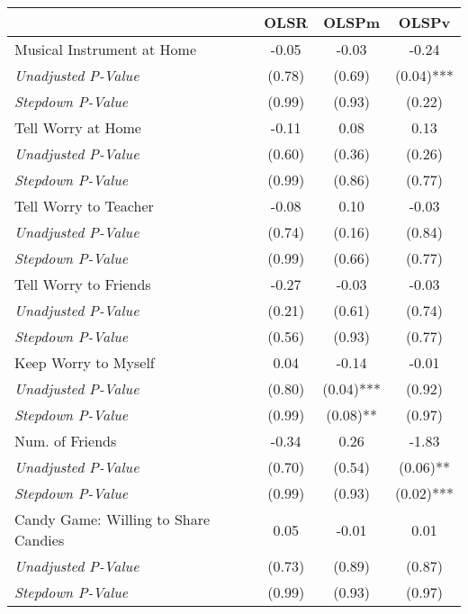 \begin{tabular}{l c c c}
\toprule
 & OLSR & OLSPm & OLSPv \\
\midrule
Musical Instrument at Home & -0.05 & -0.03 & -0.24 \\
\quad \textit{Unadjusted P-Value} & (0.78) & (0.69) & (0.04)*** \\
\quad \textit{Stepdown P-Value} & (0.99) & (0.93) & (0.22) \\
Tell Worry at Home & -0.11 & 0.08 & 0.13 \\
\quad \textit{Unadjusted P-Value} & (0.60) & (0.36) & (0.26) \\
\quad \textit{Stepdown P-Value} & (0.99) & (0.86) & (0.77) \\
Tell Worry to Teacher & -0.08 & 0.10 & -0.03 \\
\quad \textit{Unadjusted P-Value} & (0.74) & (0.16) & (0.84) \\
\quad \textit{Stepdown P-Value} & (0.99) & (0.66) & (0.77) \\
Tell Worry to Friends & -0.27 & -0.03 & -0.03 \\
\quad \textit{Unadjusted P-Value} & (0.21) & (0.61) & (0.74) \\
\quad \textit{Stepdown P-Value} & (0.56) & (0.93) & (0.77) \\
Keep Worry to Myself & 0.04 & -0.14 & -0.01 \\
\quad \textit{Unadjusted P-Value} & (0.80) & (0.04)*** & (0.92) \\
\quad \textit{Stepdown P-Value} & (0.99) & (0.08)** & (0.97) \\
Num. of Friends & -0.34 & 0.26 & -1.83 \\
\quad \textit{Unadjusted P-Value} & (0.70) & (0.54) & (0.06)** \\
\quad \textit{Stepdown P-Value} & (0.99) & (0.93) & (0.02)*** \\
Candy Game: Willing to Share Candies & 0.05 & -0.01 & 0.01 \\
\quad \textit{Unadjusted P-Value} & (0.73) & (0.89) & (0.87) \\
\quad \textit{Stepdown P-Value} & (0.99) & (0.93) & (0.97) \\
\bottomrule
\end{tabular}
